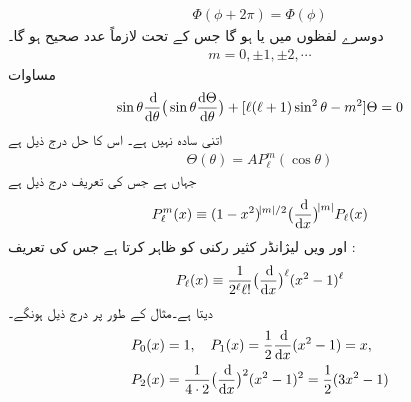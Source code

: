 \begin{align}
\Phi(\phi+2\pi)=\Phi(\phi) 
\end{align}
دوسرے لفظوں میں   یا  ہو گا جس کے تحت  لازماً عدد صحیح ہو گا۔
\begin{align}
m=0,\pm 1,\pm 2,\cdots
\end{align}
 مساوات  
\begin{align}\label{مساوات_ابعادی_تھیٹا_مساوات}
\sin{\theta}\frac{\dif}{\dif{\theta}}\big(\sin{\theta}\frac{\dif{\Theta}}{\dif{\theta}}\big)+[\ell(\ell+1)\sin^{2}{\theta}-m^{2}]\Theta=0 
\end{align}
اتنی سادہ نہیں ہے۔ اس کا حل درج ذیل ہے
\begin{align}
\Theta(\theta)=AP_{\ell}^{m}(\cos{\theta}) 
\end{align}
جہاں      ہے جس کی تعریف درج ذیل ہے
\begin{align}\label{مساوات_ابعادی_شریک_لیژانڈر_تفاعلات_تعریف}
P_{\ell}^{m}(x)\equiv (1-x^{2})^{\abs{m}/2}\big(\frac{\dif}{\dif{x}}\big)^{\abs{m}}P_{\ell}(x) 
\end{align}
اور  ویں لیژانڈر کثیر رکنی  کو     ظاہر کرتا ہے جس کی تعریف :
\begin{align}\label{مساوات_ابعادی_روڈریگیس}
P_{\ell}(x)\equiv\frac{1}{2^{\ell}\ell!}\big(\frac{\dif}{\dif{x}}\big)^{\ell}(x^{2}-1)^{\ell} 
\end{align}
دیتا ہے۔مثال کے طور پر درج ذیل ہونگے۔
\begin{align*}
P_{0}(x)&=1,\quad P_{1}(x)=\frac{1}{2}\frac{\dif}{\dif{x}}(x^{2}-1)=x ,\\
P_{2}(x)&=\frac{1}{4\cdot 2}\big(\frac{\dif}{\dif{x}}\big)^{2}(x^{2}-1)^{2}=\frac{1}{2}(3x^{2}-1) 
\end{align*}
%
